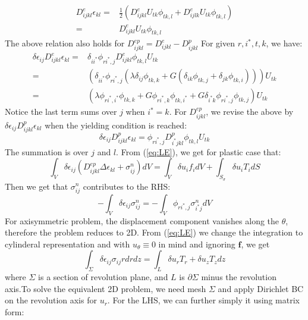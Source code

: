 \documentclass{article}
\begin{document}
\begin{align*}
D_{ijkl}^e\epsilon_{kl}=&\frac{1}{2}(D_{ijkl}^eU_{tk}\phi_{tk,l}+D_{ijlk}^eU_{tk}\phi_{tk,l})\\
=&D_{ijkl}^eU_{tk}\phi_{tk,l}
\end{align*}
The above relation also holds for $D^{ep}_{ijkl}=D^e_{ijkl}-D^p_{ijkl}$
For given $r,i^*,t,k$, we have:
\begin{align*}
\delta \epsilon_{ij}D_{ijkl}^e\epsilon_{kl}=&\delta_{ii^*}\phi_{ri^*,j}D_{ijkl}^e \phi_{tk,l} U_{tk}\\
=&\left(\delta_{ii^*}\phi_{ri^*,j}(\lambda\delta_{ij}\phi_{tk,k}+G(\delta_{ik}\phi_{tk,j}+\delta_{jk}\phi_{tk,i}))\right)U_{tk}\\
=&(\lambda \phi_{ri^*,i^*}\phi_{tk,k}+G \phi_{ri^*,k}\phi_{tk,i^*}+G\delta_{i^*k}\phi_{ri^*,j}\phi_{tk,j})U_{tk}
\end{align*}
Notice the last term sums over $j$ when $i^*=k$.
For $D^{ep}_{ijkl}$, we revise the above by $\delta \epsilon_{ij} D^p_{ijkl} \epsilon_{kl}$ when the yielding condition is reached:
\begin{equation}
\delta \epsilon_{ij} D^p_{ijkl} \epsilon_{kl}=\phi_{ri^*,j}D^p_{i^*jkl}\phi_{tk,l} U_{tk}
\end{equation}
The summation is over $ j$ and $l$.
From (\ref{eq:LE}), we get for plastic case that:
\begin{equation}
\int_V \delta{\epsilon_{ij}}(D_{ijkl}^{ep} \Delta \epsilon_{kl}+\sigma^n_{ij})dV=\int_V \delta u_i f_i dV+\int_{S_{\sigma}} \delta{u_i}T_idS
\end{equation}
Then we get that $\sigma^n_{ij}$ contributes to the RHS:
\begin{equation}
-\int_V \delta{\epsilon_{ij}}\sigma^n_{ij}=-\int_V  \phi_{ri^*,j}\sigma_{i^*j}^n dV
\end{equation}
For axisymmetric problem, the displacement component vanishes along the $\hat{\theta}$, therefore the problem reduces to 2D.
From (\ref{eq:LE}) we change the integration to cylinderal representation and with $u_{\theta}\equiv 0$ in mind and ignoring $\bm{f}$, we get
\begin{equation}
\int_{\Sigma}\delta{\epsilon}_{ij}\sigma_{ij}rdrdz=\int_{L} \delta u_r T_r+\delta u_z T_z dz
\end{equation}
where $\Sigma$ is a section of revolution plane, and $L$ is $\partial\Sigma$ minus the revolution axis.To solve the equivalent 2D problem, we need mesh $\Sigma$ and apply Dirichlet BC on the revolution axis for $u_r$.
For the LHS, we can further simply it using matrix form:
\end{document}
